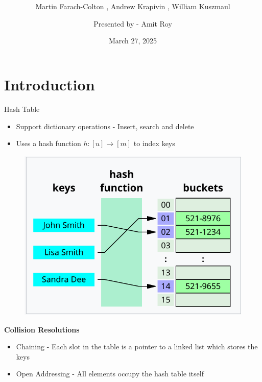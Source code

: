 \documentclass{beamer}
\title{ \sc \color{blue}{Optimal Bounds for Open Addressing Without Reordering}}
\subtitle{Martin Farach-Colton , Andrew Krapivin , William Kuszmaul}
\author{Presented by - Amit Roy }
\institute{}
\date{March 27, 2025}
\begin{document}
 
\begin{frame}
\titlepage
\end{frame} 



\section{Introduction}

\begin{frame}{Hash Table}
	\begin{itemize}
		\item Support dictionary operations - {\sc Insert, search} and {\sc delete} 
		\item Uses a hash function $h:[u]\to [m]$ to index keys
	\end{itemize}

\begin{figure}
	\includegraphics[scale=0.5]{images/hashing.png}
\end{figure}


\end{frame}
\begin{frame}
	{\bf Collision Resolutions}
	\begin{itemize}
		\item Chaining - Each slot in the table is a pointer to a linked list which stores the keys
		\item Open Addressing - All elements occupy the hash table itself
	\end{itemize}
\end{frame}
\end{document}
